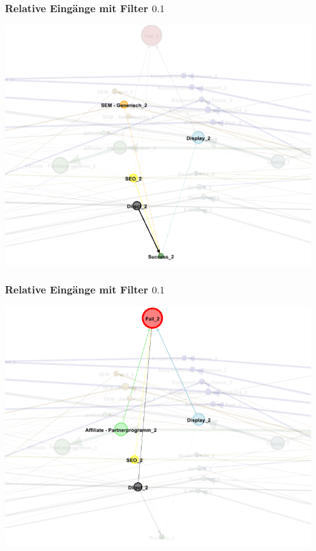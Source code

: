 \begin{frame}\frametitle{Relative Eingänge mit Filter $0.1$}
	\centering\includegraphics[scale=0.3]{in_filter_10_succ.png}
\end{frame}

\begin{frame}\frametitle{Relative Eingänge mit Filter $0.1$}
	\centering\includegraphics[scale=0.3]{in_filter_10_fail.png}
\end{frame}

